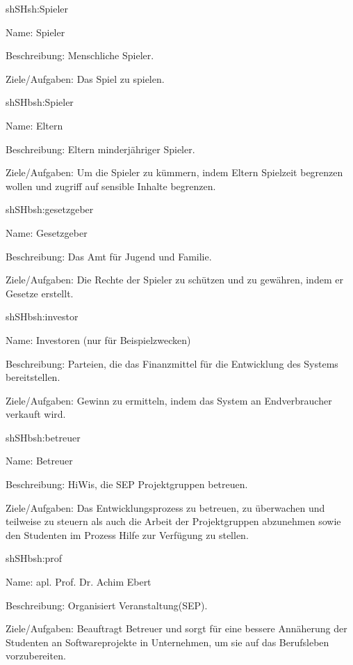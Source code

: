 \begin{description}[leftmargin=5em, style=sameline]
	
	\begin{lhp}{sh}{SH}{sh:Spieler}
		\item [Name:] Spieler
		\item [Beschreibung:] Menschliche Spieler.
		\item [Ziele/Aufgaben:] Das Spiel zu spielen.
	\end{lhp}
	
	\begin{lhp}{sh}{SH}{bsh:Spieler}
		\item [Name:] Eltern
		\item [Beschreibung:] Eltern minderjähriger Spieler.
		\item [Ziele/Aufgaben:] Um die Spieler zu kümmern, indem Eltern Spielzeit begrenzen wollen und zugriff auf sensible Inhalte begrenzen.
	\end{lhp}
	
	\begin{lhp}{sh}{SH}{bsh:gesetzgeber}
		\item [Name:] Gesetzgeber
		\item [Beschreibung:] Das Amt für Jugend und Familie.
		\item [Ziele/Aufgaben:] Die Rechte der Spieler zu schützen und zu gewähren, indem er Gesetze erstellt.
	\end{lhp}
	
	\begin{lhp}{sh}{SH}{bsh:investor}
		\item [Name:] Investoren (nur für Beispielzwecken)
		\item [Beschreibung:] Parteien, die das Finanzmittel für die Entwicklung des Systems bereitstellen.
		\item [Ziele/Aufgaben:] Gewinn zu ermitteln, indem das System an Endverbraucher verkauft wird.
	\end{lhp}
	
	\begin{lhp}{sh}{SH}{bsh:betreuer}
		\item [Name:] Betreuer
		\item [Beschreibung:] HiWis, die SEP Projektgruppen betreuen.
		\item [Ziele/Aufgaben:] Das Entwicklungsprozess zu betreuen, zu überwachen und teilweise zu steuern als auch die Arbeit der Projektgruppen abzunehmen sowie den Studenten im Prozess Hilfe zur Verfügung zu stellen. 
	\end{lhp}
	
	\begin{lhp}{sh}{SH}{bsh:prof}
		\item [Name:] apl. Prof. Dr. Achim Ebert
		\item [Beschreibung:] Organisiert Veranstaltung(SEP).
		\item [Ziele/Aufgaben:] Beauftragt Betreuer und sorgt für eine bessere Annäherung der Studenten an Softwareprojekte in Unternehmen, um sie auf das Berufsleben vorzubereiten.
	\end{lhp}
		
\end{description}

